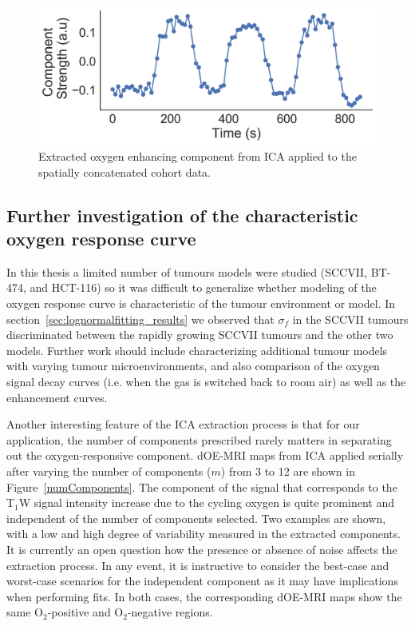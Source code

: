 \begin{figure}[htbp]
   \centering
   \includegraphics[width=\textwidth]{futurework/futurework-images/ISMRM2019_AARTS3_groupICA_OEcomponent.png} %
   \caption{Extracted oxygen enhancing component from \acs{ICA} applied to the spatially concatenated cohort data.
   \label{groupICA1}}
\end{figure}

\subsection{Further investigation of the characteristic oxygen response curve}

In this thesis a limited number of tumours models were studied (SCCVII, BT-474, and HCT-116) so it was difficult to generalize whether modeling of the oxygen response curve is characteristic of the tumour environment or model. 
In section~\ref{sec:lognormalfitting_results} we observed that $\sigma_f$ in the SCCVII tumours discriminated between the rapidly growing SCCVII tumours and the other two models.
Further work should include characterizing additional tumour models with varying tumour microenvironments, and also comparison of the oxygen signal decay curves (i.e. when the gas is switched back to room air) as well as the enhancement curves.

\label{sec:numComponents}
Another interesting feature of the \acs{ICA} extraction process is that for our application, the number of components prescribed rarely matters in separating out the oxygen-responsive component.
\acs{dOE-MRI} maps from \acs{ICA} applied serially after varying the number of components ($m$) from 3 to 12 are shown in Figure~\ref{numComponents}.
The component of the signal that corresponds to the T$_1$W signal intensity increase due to the cycling oxygen is quite prominent and independent of the number of components selected.
Two examples are shown, with a low and high degree of variability measured in the extracted components.
It is currently an open question how the presence or absence of noise affects the extraction process. 
In any event, it is instructive to consider the best-case and worst-case scenarios for the independent component as it may have implications when performing fits.
In both cases, the corresponding \acs{dOE-MRI} maps show the same O$_2$-positive and O$_2$-negative regions.


